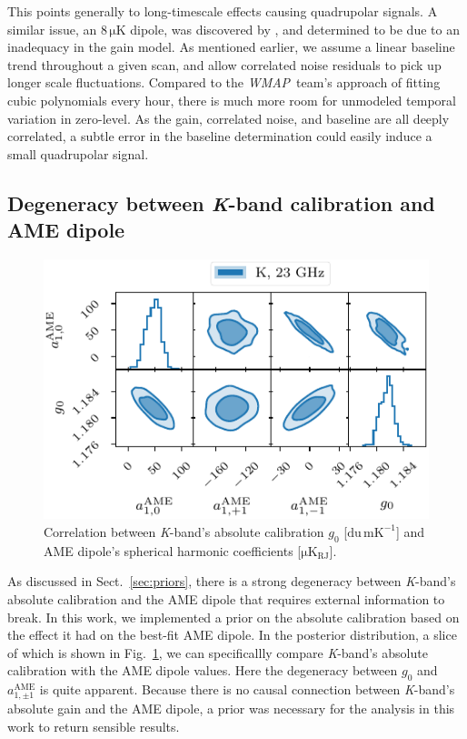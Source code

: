 \documentclass[twocolumn]{../../common/aa}
\def\WMAP{\emph{WMAP}}
\def\WMAPnine{\emph{WMAP9}}
\newcommand{\K}[0]{\textit K}
\begin{document}
This points generally to long-timescale effects causing quadrupolar signals. A similar issue, an $8\,\mathrm{\mu K}$ dipole,  was discovered by \citet{jarosik2007}, and determined to be due to an inadequacy in the gain model. As mentioned earlier, we assume a linear baseline trend throughout a given scan, and allow correlated noise residuals to pick up longer scale fluctuations. Compared to the \WMAP\ team's approach of fitting cubic polynomials every hour, there is much more room for unmodeled temporal variation in zero-level. As the gain, correlated noise, and baseline are all deeply correlated, a subtle error in the baseline determination could easily induce a small quadrupolar signal.



\subsection{Degeneracy between \K-band calibration and AME dipole}
\label{sec:ame_Kband}

\begin{figure}
	\includegraphics[width=\columnwidth]{figures/ame_dipole_vs_g0_K.pdf}
	\caption{Correlation between \K-band's absolute calibration $g_0$ [$\mathrm{du\,mK^{-1}}$] and AME dipole's spherical harmonic coefficients [$\mathrm{\mu K_{RJ}}$].}
	\label{fig:ame_g0}
\end{figure}


As discussed in Sect.~\ref{sec:priors}, there is a strong degeneracy between \K-band's absolute calibration and the AME dipole that requires external information to break.  In this work, we implemented a prior on the absolute calibration based on the effect it had on the best-fit AME dipole. In the posterior distribution, a slice of which is shown in Fig.~\ref{fig:ame_g0},  we can specificallly  compare \K-band's absolute calibration with the AME dipole values. Here the degeneracy between $g_0$ and $a_{1,\pm1}^\mathrm{AME}$ is quite apparent. Because there is no causal connection between \K-band's absolute gain and the AME dipole, a prior was  necessary for the analysis in this work to return sensible results.
\end{document}
